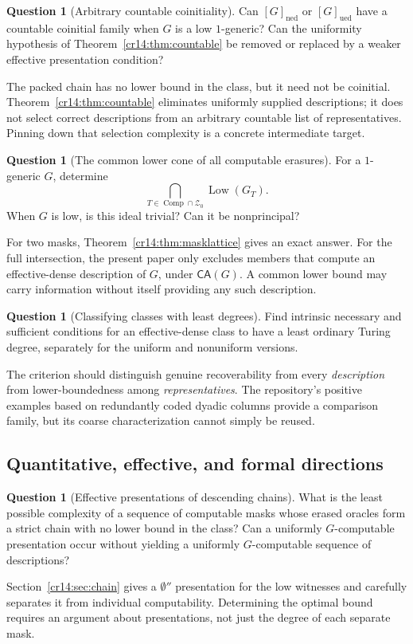 \documentclass[11pt,a4paper]{article}
\newcommand{\ned}{\mathrm{ned}}
\newcommand{\ued}{\mathrm{ued}}
\newcommand{\Znull}{\mathcal Z_0}
\newcommand{\Comp}{\operatorname{Comp}}
\newcommand{\Low}{\operatorname{Low}}
\newcommand{\doublezero}{\emptyset''}
\newcommand{\CA}{\mathsf{CA}}
\theoremstyle{definition}
\newtheorem{question}[theorem]{Question}
\theoremstyle{remark}
\begin{document}
\begin{question}[Arbitrary countable coinitiality]\label{cr14:q:coinitial}
Can $[G]_{\ned}$ or $[G]_{\ued}$ have a countable coinitial family when $G$
is a low $1$-generic? Can the uniformity hypothesis of
Theorem~\ref{cr14:thm:countable} be removed or replaced by a weaker effective
presentation condition?
\end{question}
The packed chain has no lower bound in the class, but it need not be
coinitial. Theorem~\ref{cr14:thm:countable} eliminates uniformly supplied
descriptions; it does not select correct descriptions from an arbitrary
countable list of representatives. Pinning down that selection complexity
is a concrete intermediate target.

\begin{question}[The common lower cone of all computable erasures]
\label{cr14:q:common}
For a $1$-generic $G$, determine
\[
 \bigcap_{T\in\Comp\cap\Znull}\Low(G_T).
\]
When $G$ is low, is this ideal trivial? Can it be nonprincipal?
\end{question}
For two masks, Theorem~\ref{cr14:thm:masklattice} gives an exact answer.
For the full intersection, the present paper only excludes members that
compute an effective-dense description of $G$, under $\CA(G)$.
A common lower bound may carry information without itself providing any
such description.

\begin{question}[Classifying classes with least degrees]\label{cr14:q:positive}
Find intrinsic necessary and sufficient conditions for an effective-dense
class to have a least ordinary Turing degree, separately for the uniform
and nonuniform versions.
\end{question}
The criterion should distinguish genuine recoverability from every
\emph{description} from lower-boundedness among \emph{representatives}.
The repository's positive examples based on redundantly coded dyadic
columns provide a comparison family, but its coarse characterization
cannot simply be reused.\cite{ProveIt}

\subsection{Quantitative, effective, and formal directions}
\begin{question}[Effective presentations of descending chains]\label{cr14:q:chainindex}
What is the least possible complexity of a sequence of computable masks
whose erased oracles form a strict chain with no lower bound in the class?
Can a uniformly $G$-computable presentation occur without yielding a
uniformly $G$-computable sequence of descriptions?
\end{question}
Section~\ref{cr14:sec:chain} gives a $\doublezero$ presentation for the low
witnesses and carefully separates it from individual computability.
Determining the optimal bound requires an argument about presentations,
not just the degree of each separate mask.
\end{document}
